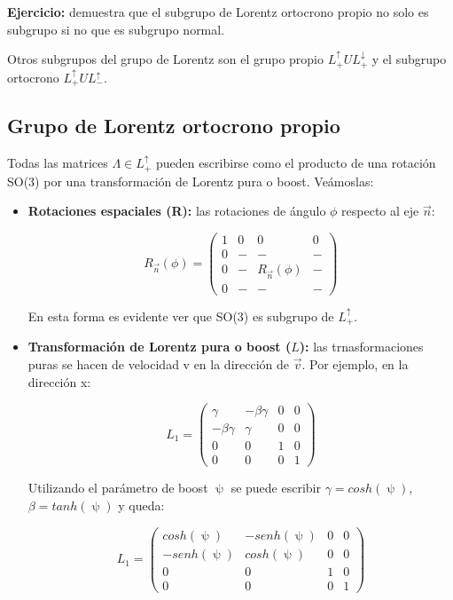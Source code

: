 \smallskip
\textbf{Ejercicio:} demuestra que el subgrupo de Lorentz ortocrono propio no solo es subgrupo si no que es subgrupo normal.

Otros subgrupos del grupo de Lorentz son el grupo propio $L_+^\uparrow U L_+^\downarrow$ y el subgrupo ortocrono $L_+^\uparrow U L_-^\uparrow$.

\subsection{Grupo de Lorentz ortocrono propio}

Todas las matrices $\Lambda \in L_+^\uparrow$ pueden escribirse como el producto de una rotación SO(3) por una transformación de Lorentz pura o boost. Veámoslas:

\begin{itemize}
\item \textbf{Rotaciones espaciales (R):} las rotaciones de ángulo $\phi$ respecto al eje $\Vec{n}$:

$$R_{\Vec{n}}(\phi) = \left( \begin{array}{c|ccc}
     1& 0 & 0 & 0  \\
     \hline
       0& - & - & -  \\
         0& - & R_\Vec{n}(\phi) & -  \\
           0& - & - & -
\end{array}\right)$$

En esta forma es evidente ver que SO(3) es subgrupo de $L_+^\uparrow$.

\newpage

\item \textbf{Transformación de Lorentz pura o boost  ($L$):} las trnasformaciones puras se hacen de velocidad v en la dirección de $\Vec{v}$. Por ejemplo, en la dirección x:

$$L_1=\left ( \begin{array}{cccc}
       \gamma & -\beta \gamma & 0 & 0  \\
        -\beta \gamma & \gamma & 0 & 0  \\
          0& 0 & 1 & 0  \\
            0& 0 & 0 & 1
\end{array}\right)$$

Utilizando el parámetro de boost $\uppsi$ se puede escribir $\gamma =cosh(\uppsi)$, $\beta = tanh(\uppsi)$ y queda:

$$L_1=\left ( \begin{array}{cccc}
       cosh(\uppsi) & -senh(\uppsi) & 0 & 0  \\
        -senh(\uppsi) & cosh(\uppsi) & 0 & 0  \\
          0& 0 & 1 & 0  \\
            0& 0 & 0 & 1
\end{array}\right)$$


\end{itemize}

